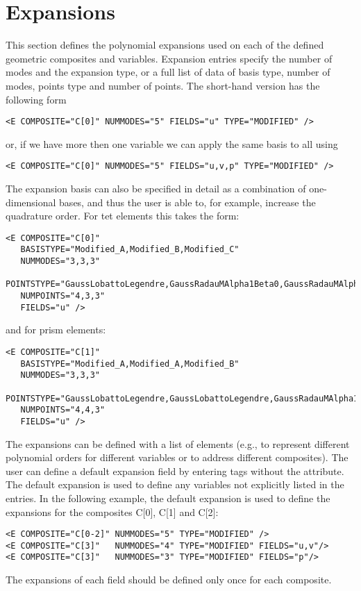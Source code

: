 \section{Expansions}
This section defines the polynomial expansions used on each of the defined
geometric composites and variables. Expansion entries specify the number of
modes and the expansion type, or a full list of data of basis type, number of
modes, points type and number of points. The short-hand version has the
following form

\begin{lstlisting}[style=XMLStyle]
<E COMPOSITE="C[0]" NUMMODES="5" FIELDS="u" TYPE="MODIFIED" />
\end{lstlisting}

or, if we have more then one variable we can apply the same basis to all using

\begin{lstlisting}[style=XMLStyle]
<E COMPOSITE="C[0]" NUMMODES="5" FIELDS="u,v,p" TYPE="MODIFIED" />
\end{lstlisting}

The expansion basis can also be specified in detail as a combination of
one-dimensional bases, and thus the user is able to, for example, increase the
quadrature order. For tet elements this takes the form:

\begin{lstlisting}[style=XMLStyle]
<E COMPOSITE="C[0]" 
   BASISTYPE="Modified_A,Modified_B,Modified_C" 
   NUMMODES="3,3,3"
   POINTSTYPE="GaussLobattoLegendre,GaussRadauMAlpha1Beta0,GaussRadauMAlpha2Beta0"
   NUMPOINTS="4,3,3"
   FIELDS="u" />
\end{lstlisting}

and for prism elements:

\begin{lstlisting}[style=XMLStyle]
<E COMPOSITE="C[1]" 
   BASISTYPE="Modified_A,Modified_A,Modified_B" 
   NUMMODES="3,3,3"
   POINTSTYPE="GaussLobattoLegendre,GaussLobattoLegendre,GaussRadauMAlpha1Beta0"
   NUMPOINTS="4,4,3"
   FIELDS="u" />
\end{lstlisting}

The expansions can be defined with a list of  elements (e.g., to
represent different polynomial orders for different variables or to address
different composites). The user can define a default expansion field by entering
 tags without the  attribute. The default expansion is
used to define any variables not explicitly listed in the  entries.
In the following example, the default expansion is used to define the expansions
for the composites C[0], C[1] and C[2]:

\begin{lstlisting}[style=XMLStyle]
<E COMPOSITE="C[0-2]" NUMMODES="5" TYPE="MODIFIED" />
<E COMPOSITE="C[3]"   NUMMODES="4" TYPE="MODIFIED" FIELDS="u,v"/>
<E COMPOSITE="C[3]"   NUMMODES="3" TYPE="MODIFIED" FIELDS="p"/>
\end{lstlisting}

The expansions of each field should be defined only once for each composite.
